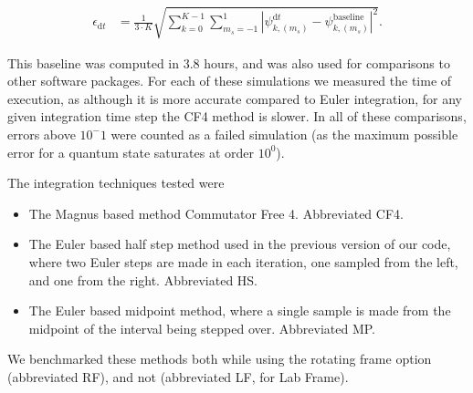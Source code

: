 \documentclass{jors}
\begin{document}
			\begin{align}
                \epsilon_{\mathrm{d}t} &= \frac{1}{3\cdot K}\sqrt{\sum_{k = 0}^{K - 1}\sum_{m_s = -1}^1|\psi_{k, (m_s)}^{\mathrm{d}t} - \psi_{k, (m_s)}^{\textrm{baseline}}|^2}.
            \end{align}

			This baseline was computed in 3.8 hours, and was also used for comparisons to other software packages. For each of these simulations we measured the time of execution, as although it is more accurate compared to Euler integration, for any given integration time step the CF4 method is slower. In all of these comparisons, errors above \(10^-1\) were counted as a failed simulation (as the maximum possible error for a quantum state saturates at order \(10^0\)).

			The integration techniques tested were
			\begin{itemize}
				\item The Magnus based method Commutator Free 4. Abbreviated CF4.
				\item The Euler based half step method used in the previous version of our code, where two Euler steps are made in each iteration, one sampled from the left, and one from the right. Abbreviated HS.
				\item The Euler based midpoint method, where a single sample is made from the midpoint of the interval being stepped over. Abbreviated MP.
			\end{itemize}

			We benchmarked these methods both while using the rotating frame option (abbreviated RF), and not (abbreviated LF, for Lab Frame).


\end{document}
